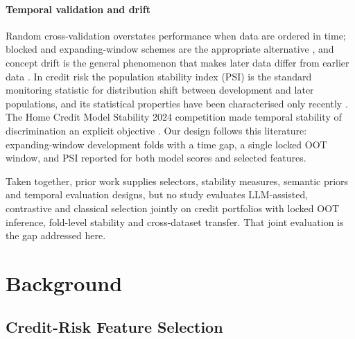 \documentclass[preprint,12pt]{elsarticle}
\begin{document}
\paragraph{Temporal validation and drift}
Random cross-validation overstates performance when data are ordered in time; blocked and expanding-window schemes are the appropriate alternative \cite{bergmeir2012}, and concept drift is the general phenomenon that makes later data differ from earlier data \cite{gama2014}. In credit risk the population stability index (PSI) is the standard monitoring statistic for distribution shift between development and later populations, and its statistical properties have been characterised only recently \cite{yurdakul2020}. The Home Credit Model Stability 2024 competition made temporal stability of discrimination an explicit objective \cite{homecredit2024}. Our design follows this literature: expanding-window development folds with a time gap, a single locked OOT window, and PSI reported for both model scores and selected features.

Taken together, prior work supplies selectors, stability measures, semantic priors and temporal evaluation designs, but no study evaluates LLM-assisted, contrastive and classical selection jointly on credit portfolios with locked OOT inference, fold-level stability and cross-dataset transfer. That joint evaluation is the gap addressed here.


\section{Background}
\label{sec:background}

\subsection{Credit-Risk Feature Selection}
\label{subsec:credit_risk_fs}
\end{document}
